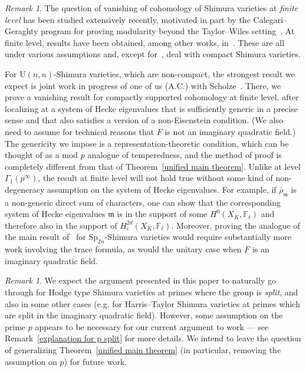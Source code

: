 \documentclass{amsart}
\theoremstyle{remark}
\newtheorem{remark}[subsubsection]{Remark}
\numberwithin{equation}{subsection}
\newcommand{\F}{\FF}
\newcommand{\m}{\frakm}
\newcommand{\FF}{{\mathbb F}}
\newcommand{\frakm}{\mathfrak{m}}
\renewcommand{\(}{\left(}
\renewcommand{\)}{\right)}
\begin{document}
\begin{remark} The question of vanishing of cohomology of Shimura varieties at \emph{finite level} has been studied extensively recently, motivated in part by the Calegari--Geraghty program for proving modularity beyond the Taylor--Wiles setting~\cite{calegari-geraghty}. At finite level, results have been obtained, among other works, in~\cite{lan-suh, lan-suh2, boyer, caraiani-scholze}. These are all under various assumptions and, except for~\cite{lan-suh2}, deal with compact Shimura varieties. 

For $\mathrm{U}(n,n)$-Shimura varieties, which are non-compact, the strongest result we expect is joint work in progress of one of us (A.C.) 
with Scholze~\cite{caraiani-scholze2}. There, we prove a vanishing result for compactly supported cohomology at finite level, after localizing at a system of Hecke eigenvalues that is sufficiently generic in a precise sense and that also satisfies a version of a non-Eisenstein condition. (We also need to assume for technical reasons that $F$ is not an imaginary quadratic field.) 
The genericity we impose is a representation-theoretic condition, 
which can be thought of as a mod $p$ analogue of temperedness, and the method of proof is completely different 
from that of Theorem~\ref{unified main theorem}. Unlike at level $\Gamma_1(p^\infty)$, the result at finite 
level will not hold true without some kind of non-degeneracy assumption on the system of Hecke eigenvalues. 
For example, if $\bar{\rho}_{\m}$ is a non-generic direct sum of characters, one can show that the corresponding system of Hecke eigenvalues 
$\m$ is in the support of some $H^0(X_K, \F_{\ell})$ and therefore also in the support of $H^{2d}_c(X_K, \F_{\ell})$. 
Moreover, proving the analogue of the main result of~\cite{caraiani-scholze2} for $\mathrm{Sp}_{2n}$-Shimura varieties would 
require substantially more work involving the trace formula, as would the unitary case when $F$ is an imaginary quadratic field.
\end{remark}

\begin{remark} 
We expect the argument presented in this paper to naturally go through for Hodge type Shimura varieties at primes where the group is \emph{split}, and also in some other cases (e.g. for Harris--Taylor Shimura varieties at primes which are split in the imaginary quadratic field). However, some assumption on the prime $p$ appears to be necessary for our current argument to work --- see Remark~\ref{explanation for p split} for more details. We intend to leave the question of generalizing Theorem~\ref{unified main theorem} (in particular, removing the assumption on $p$) for future work.
\end{remark}
\end{document}
